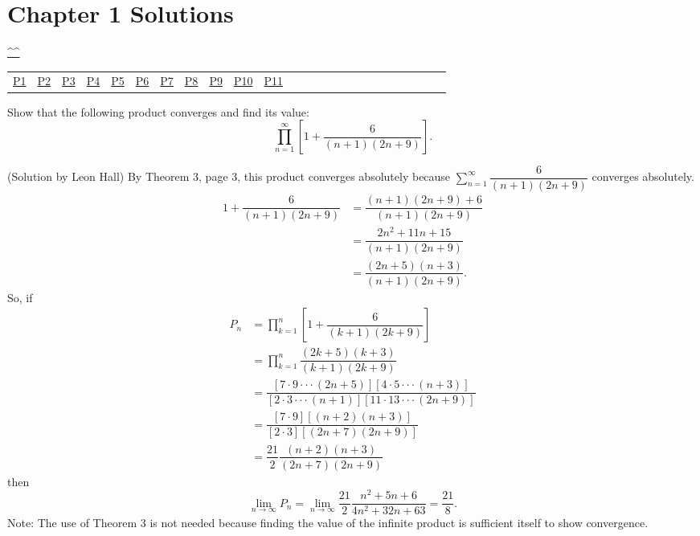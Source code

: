 
\section{Chapter 1 Solutions}
\begin{center}\hyperref[toc]{\^{}\^{}}\end{center}
\begin{center}\begin{tabular}{lllllllllllllllllllllllll}
\hyperref[problem1chapter1]{P1} & \hyperref[problem2chapter1]{P2} & \hyperref[problem3chapter1]{P3} & \hyperref[problem4chapter1]{P4} & \hyperref[problem5chapter1]{P5} & \hyperref[problem6chapter1]{P6} & \hyperref[problem7chapter1]{P7} & \hyperref[problem8chapter1]{P8} & \hyperref[problem9chapter1]{P9} & \hyperref[problem10chapter1]{P10} & \hyperref[problem11chapter1]{P11} 
\end{tabular}\end{center}
\begin{problem}\label{problem1chapter1}
Show that the following product converges and find its value: 
$$\displaystyle\prod_{n=1}^{\infty} \left[ 1 + \dfrac{6}{(n+1)(2n+9)} \right].$$
\end{problem}
\begin{solution}(Solution by Leon Hall)
By Theorem 3, page 3, this product converges absolutely because $\displaystyle\sum_{n=1}^{\infty} \dfrac{6}{(n+1)(2n+9)}$ converges absolutely.
$$\begin{array}{ll}
1 + \dfrac{6}{(n+1)(2n+9)} &= \dfrac{(n+1)(2n+9)+6}{(n+1)(2n+9)} \\
&= \dfrac{2n^2+11n+15}{(n+1)(2n+9)} \\
&= \dfrac{(2n+5)(n+3)}{(n+1)(2n+9)}.
\end{array}$$
So, if 
$$\begin{array}{ll}
P_n &= \displaystyle\prod_{k=1}^n \left[ 1 + \dfrac{6}{(k+1)(2k+9)} \right] \\
&= \displaystyle\prod_{k=1}^n \dfrac{(2k+5)(k+3)}{(k+1)(2k+9)} \\
&= \dfrac{[7 \cdot 9 \cdot  \cdot  \cdot (2n+5)][4 \cdot 5 \cdot  \cdot  \cdot (n+3)]}{[2 \cdot 3 \cdot  \cdot  \cdot (n+1)][11 \cdot 13 \cdot  \cdot  \cdot  (2n+9)]} \\
&= \dfrac{[7 \cdot 9][(n+2) (n+3)]}{[2 \cdot 3][(2n+7) (2n+9)]} \\
&= \dfrac{21}{2} \dfrac{(n+2)(n+3)}{(2n+7)(2n+9)}
\end{array}$$
then
$$\displaystyle\lim_{n \rightarrow \infty} P_n = \displaystyle\lim_{n \rightarrow \infty} \dfrac{21}{2} \dfrac{n^2 + 5n+6}{4n^2+32n+63} = \dfrac{21}{8}.$$
Note: The use of Theorem 3 is not needed because finding the value of the infinite product is sufficient itself to show convergence.
\end{solution}
